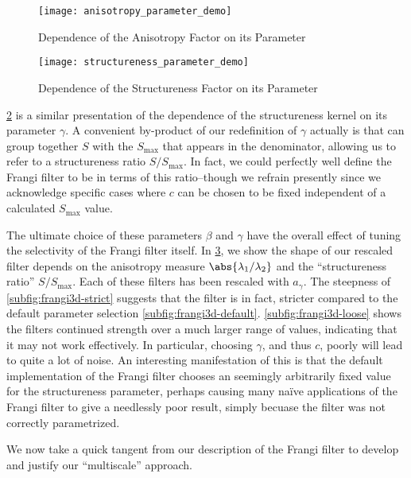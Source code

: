 \begin{figure}[t] \centering
  \texttt{[image: anisotropy\_parameter\_demo]}
  \caption{Dependence of the Anisotropy Factor on its Parameter}
  \label{fig:anisotropy-parameter-demo}
\end{figure}

\begin{figure}[t] \centering
  \texttt{[image: structureness\_parameter\_demo]}
  \caption{Dependence of the Structureness Factor on its Parameter}
  \label{fig:structureness-parameter-demo}
\end{figure}

\cref{fig:structureness-parameter-demo} is a similar presentation of the dependence of the structureness kernel on its parameter $\gamma$.
A convenient by-product of our redefinition of $\gamma$ actually is that can group together $S$ with the $S_{\max}$ that appears in the denominator, allowing us to refer to a structureness ratio $S/S_{\max}$. In fact, we could perfectly well define the Frangi filter to be in terms of this ratio--though we refrain presently since we acknowledge specific cases where $c$ can be chosen to be fixed independent of a calculated $S_{\max}$ value.


The ultimate choice of these parameters $\beta$ and $\gamma$ have the overall effect of tuning the selectivity of the Frangi filter itself. In \cref{fig:frangi3d-selection}, we show the shape of our rescaled filter depends on the anisotropy measure $\abs{\lambda_1 / \lambda_2}$ and the ``structureness ratio'' $S/S_{\max}$. Each of these filters has been rescaled with $a_\gamma$. The steepness of \cref{subfig:frangi3d-strict} suggests that the filter is in fact, stricter compared to the default parameter selection \cref{subfig:frangi3d-default}. \cref{subfig:frangi3d-loose} shows the filters continued strength over a much larger range of values, indicating that it may not work effectively. In particular, choosing $\gamma$, and thus $c$, poorly will lead to quite a lot of noise.
An interesting manifestation of this is that the default implementation of the Frangi filter \cite{scipy} chooses an seemingly arbitrarily fixed value for the structureness parameter, perhaps causing many na\"ive applications of the Frangi filter to give a needlessly poor result, simply becuase the filter was not correctly parametrized.

\begin{figure}[t] \centering
\subfloat[Strict]{\texttt{[image: 4]}} \label{subfig:frangi3d-strict}
\subfloat[Standard]{\texttt{[image: 14]}} \label{subfig:frangi3d-default}
 \label{subfig:frangi3d-loose}
\label{fig:frangi3d-selection}
\end{figure}



	We now take a quick tangent from our description of the Frangi filter to develop and justify our ``multiscale'' approach.
	
